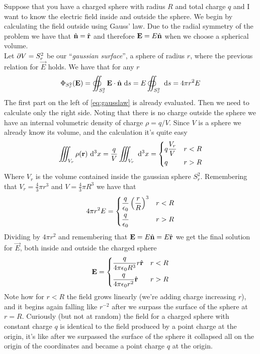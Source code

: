 \documentclass[../electromagnetism]{subfiles}
\begin{document}
\begin{eg}
	Suppose that you have a charged sphere with radius $R$ and total charge $q$ and I want to know the electric field inside and outside the sphere. We begin by calculating the field outside using Gauss' law. Due to the radial symmetry of the problem we have that $\hat{\mathbf{n}}=\hat{\mathbf{r}}$ and therefore $\mathbf{E}=E\hat{\mathbf{n}}$ when we choose a spherical volume.\\
	Let $\partial V=S_r^2$ be our ``\textit{gaussian surface}'', a sphere of radius $r$, where the previous relation for $\vec{E}$ holds. We have that for any $r$
	\begin{equation}
		\Phi_{S^2_r}(\mathbf{E})=\oiint_{S^2_r}\mathbf{E}\cdot\hat{\mathbf{n}}\ \mathrm{d} s=E\oiint_{S_r^2}\ \mathrm{d} s= 4\pi r^2E
		\label{eq:efluxsphere}
	\end{equation}
	The first part on the left of \eqref{eq:gausslaw} is already evaluated. Then we need to calculate only the right side. Noting that there is no charge outside the sphere we have an internal volumetric density of charge $\rho=q/V$. Since $V$ is a sphere we already know its volume, and the calculation it's quite easy
	\begin{equation}
		\iiint_{V_r}\rho(\mathbf{r})\ \mathrm{d}^3x=\frac{q}{V}\iiint_{V_r}\ \mathrm{d}^3x=\begin{dcases}
			q\frac{V_r}{V}&r<R\\
			q&r>R
		\end{dcases}
		\label{eq:charge}
	\end{equation}
	Where $V_r$ is the volume contained inside the gaussian sphere $S^2_r$. Remembering that $V_r=\frac{4}{3}\pi r^3$ and $V=\frac{4}{3}\pi R^3$ we have that
	\begin{equation}
		4\pi r^2E=\begin{dcases}
			\frac{q}{\epsilon_0}\left( \frac{r}{R} \right)^3&r<R\\
			\frac{q}{\epsilon_0}&r>R
		\end{dcases}
		\label{eq:almostsol}
	\end{equation}
	Dividing by $4\pi r^2$ and remembering that $\mathbf{E}=E\hat{\mathbf{n}}=E\hat{\mathbf{r}}$ we get the final solution for $\vec{E}$, both inside and outside the charged sphere
	\begin{equation}
		\mathbf{E}=\begin{dcases}
			\frac{q}{4\pi\epsilon_0 R^3}r\hat{\mathbf{r}}&r<R\\
			\frac{q}{4\pi\epsilon_0 r^2}\hat{\mathbf{r}}&r>R
		\end{dcases}
		\label{eq:eqsphere}
	\end{equation}
	Note how for $r<R$ the field grows linearly (we're adding charge increasing $r$), and it begins again falling like $r^{-2}$ after we surpass the surface of the sphere at $r=R$. Curiously (but not at random) the field for a charged sphere with constant charge $q$ is identical to the field produced by a point charge at the origin, it's like after we surpassed the surface of the sphere it collapsed all on the origin of the coordinates and became a point charge $q$ at the origin.
\end{eg}
\end{document}
